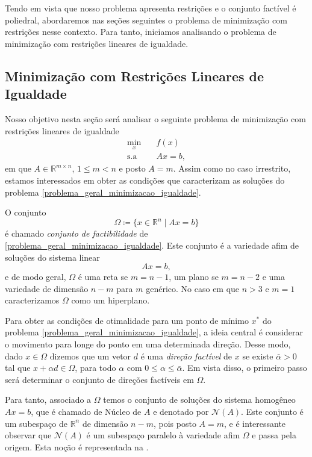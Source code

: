 \documentclass[12pt,a4paper]{scrartcl}
\def\RR{\mathds{R}}
\theoremstyle{definition}%
\begin{document}
Tendo em vista que nosso problema apresenta restrições e o conjunto factível é poliedral, abordaremos nas seções seguintes o problema de minimização com restrições nesse contexto. Para tanto, iniciamos analisando o problema de minimização com restrições lineares de igualdade.


\subsection{Minimização com Restrições Lineares de Igualdade} \label{section:restricoes_igualdade}

Nosso objetivo nesta seção será analisar o seguinte problema de minimização com restrições lineares de igualdade
\[ \label{problema_geral_minimizacao_igualdade}
\begin{aligned}
\min_{x} & \quad f(x) \\
\text{s.a} & \quad Ax=b,
\end{aligned}
\]
em que $A \in \RR^{m\times n}$, $1 \leq m <n$ e posto $A=m$. Assim como no caso irrestrito, estamos interessados em obter as condições que caracterizam as soluções do problema \eqref{problema_geral_minimizacao_igualdade}.

O conjunto
\[
\Omega \coloneqq  \{ x \in \RR^{n} \mid Ax=b \}
\]
é chamado \emph{conjunto de factibilidade} de \eqref{problema_geral_minimizacao_igualdade}. Este conjunto é a variedade afim de soluções do sistema linear
\[ \label{eq:restricao_de_igualdade}
Ax=b,
\]
e de modo geral, $\Omega$ é uma reta se $m=n-1$, um plano se $m=n-2$ e uma variedade de dimensão $n-m$ para $m$ genérico. No caso em que $n>3$ e $m=1$ caracterizamos $\Omega$ como um hiperplano. 

Para obter as condições de otimalidade para um ponto de mínimo $x^{*}$ do problema \eqref{problema_geral_minimizacao_igualdade}, a ideia central é considerar o movimento para longe do ponto em uma determinada direção. Desse modo, dado $x \in \Omega$ dizemos que um vetor $d$ é uma \emph{direção factível} de $x$ se existe $\bar{\alpha} >0$ tal que $x + \alpha d \in \Omega$, para todo $\alpha$ com $0 \leq \alpha \leq \bar{\alpha}$. Em vista disso, o primeiro passo será determinar o conjunto de direções factíveis em $\Omega$. 

Para tanto, associado a $\Omega$ temos o conjunto de soluções do sistema homogêneo $Ax=b$, que é chamado de Núcleo de $A$ e denotado por $\mathcal{N}(A)$. Este conjunto é um subespaço de $\RR^{n}$ de dimensão $n-m$, pois posto $A=m$, e é interessante observar que $\mathcal{N}(A)$ é um subespaço paralelo à variedade afim $\Omega$ e passa pela origem. Esta noção é representada na .
\end{document}
